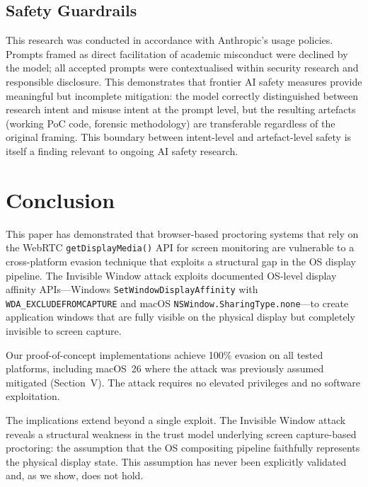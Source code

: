 \documentclass[conference]{IEEEtran}
\begin{document}
\subsection{Safety Guardrails}

This research was conducted in accordance with Anthropic's usage policies. Prompts framed as direct facilitation of academic misconduct were declined by the model; all accepted prompts were contextualised within security research and responsible disclosure. This demonstrates that frontier AI safety measures provide meaningful but incomplete mitigation: the model correctly distinguished between research intent and misuse intent at the prompt level, but the resulting artefacts (working PoC code, forensic methodology) are transferable regardless of the original framing. This boundary between intent-level and artefact-level safety is itself a finding relevant to ongoing AI safety research.

\section{Conclusion}

This paper has demonstrated that browser-based proctoring systems that rely on the WebRTC \texttt{getDisplayMedia()} API for screen monitoring are vulnerable to a cross-platform evasion technique that exploits a structural gap in the OS display pipeline. The Invisible Window attack exploits documented OS-level display affinity APIs---Windows \texttt{SetWindowDisplayAffinity} with \texttt{WDA\_EXCLUDEFROMCAPTURE} and macOS \texttt{NSWindow.SharingType.none}---to create application windows that are fully visible on the physical display but completely invisible to screen capture.

Our proof-of-concept implementations achieve 100\% evasion on all tested platforms, including macOS~26 where the attack was previously assumed mitigated (Section~V). The attack requires no elevated privileges and no software exploitation.

The implications extend beyond a single exploit. The Invisible Window attack reveals a structural weakness in the trust model underlying screen capture-based proctoring: the assumption that the OS compositing pipeline faithfully represents the physical display state. This assumption has never been explicitly validated and, as we show, does not hold.
\end{document}
